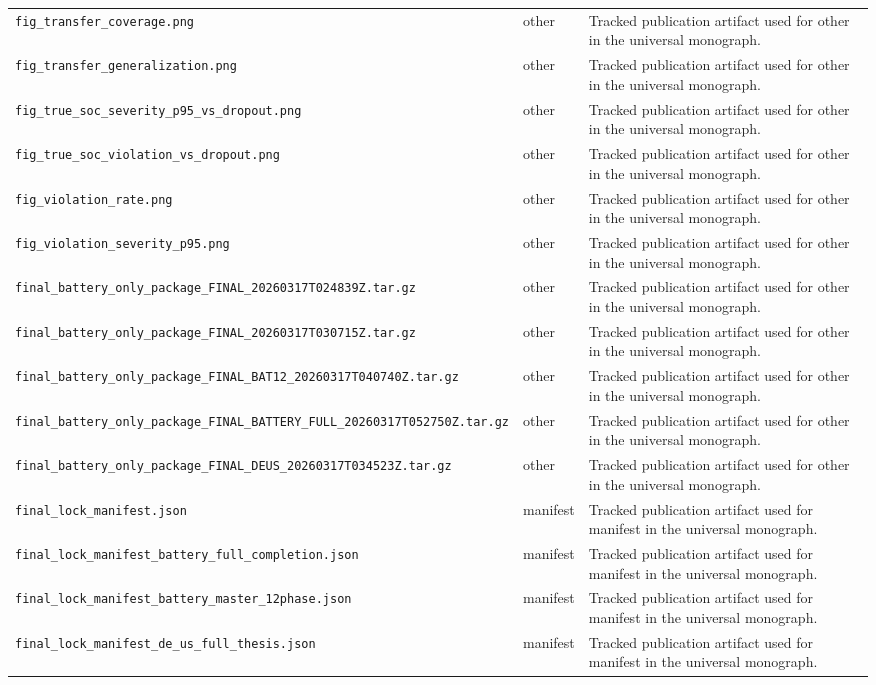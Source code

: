\begin{longtable}{p{}p{}p{}}
\texttt{fig\_transfer\_coverage.png} & other & Tracked publication artifact used for other in the universal monograph.\\
\texttt{fig\_transfer\_generalization.png} & other & Tracked publication artifact used for other in the universal monograph.\\
\texttt{fig\_true\_soc\_severity\_p95\_vs\_dropout.png} & other & Tracked publication artifact used for other in the universal monograph.\\
\texttt{fig\_true\_soc\_violation\_vs\_dropout.png} & other & Tracked publication artifact used for other in the universal monograph.\\
\texttt{fig\_violation\_rate.png} & other & Tracked publication artifact used for other in the universal monograph.\\
\texttt{fig\_violation\_severity\_p95.png} & other & Tracked publication artifact used for other in the universal monograph.\\
\texttt{final\_battery\_only\_package\_FINAL\_20260317T024839Z.tar.gz} & other & Tracked publication artifact used for other in the universal monograph.\\
\texttt{final\_battery\_only\_package\_FINAL\_20260317T030715Z.tar.gz} & other & Tracked publication artifact used for other in the universal monograph.\\
\texttt{final\_battery\_only\_package\_FINAL\_BAT12\_20260317T040740Z.tar.gz} & other & Tracked publication artifact used for other in the universal monograph.\\
\texttt{final\_battery\_only\_package\_FINAL\_BATTERY\_FULL\_20260317T052750Z.tar.gz} & other & Tracked publication artifact used for other in the universal monograph.\\
\texttt{final\_battery\_only\_package\_FINAL\_DEUS\_20260317T034523Z.tar.gz} & other & Tracked publication artifact used for other in the universal monograph.\\
\texttt{final\_lock\_manifest.json} & manifest & Tracked publication artifact used for manifest in the universal monograph.\\
\texttt{final\_lock\_manifest\_battery\_full\_completion.json} & manifest & Tracked publication artifact used for manifest in the universal monograph.\\
\texttt{final\_lock\_manifest\_battery\_master\_12phase.json} & manifest & Tracked publication artifact used for manifest in the universal monograph.\\
\texttt{final\_lock\_manifest\_de\_us\_full\_thesis.json} & manifest & Tracked publication artifact used for manifest in the universal monograph.\\

\end{longtable}
